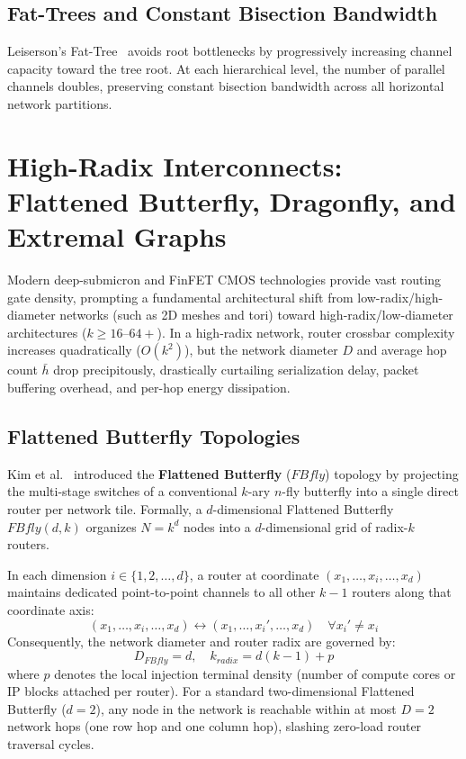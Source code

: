 \subsection{Fat-Trees and Constant Bisection Bandwidth}
Leiserson's Fat-Tree~\cite{Leiserson1985} avoids root bottlenecks by progressively increasing channel capacity toward the tree root. At each hierarchical level, the number of parallel channels doubles, preserving constant bisection bandwidth across all horizontal network partitions.

\section{High-Radix Interconnects: Flattened Butterfly, Dragonfly, and Extremal Graphs}
\label{sec:ch4_high_radix}

Modern deep-submicron and FinFET CMOS technologies provide vast routing gate density, prompting a fundamental architectural shift from low-radix/high-diameter networks (such as 2D meshes and tori) toward high-radix/low-diameter architectures ($k \ge 16$--$64+$). In a high-radix network, router crossbar complexity increases quadratically ($O(k^2)$), but the network diameter $D$ and average hop count $\bar{h}$ drop precipitously, drastically curtailing serialization delay, packet buffering overhead, and per-hop energy dissipation.

\subsection{Flattened Butterfly Topologies}
\label{subsec:ch4_fbfly}
Kim et al.~\cite{Kim2007} introduced the \textbf{Flattened Butterfly} ($FBfly$) topology by projecting the multi-stage switches of a conventional $k$-ary $n$-fly butterfly into a single direct router per network tile. Formally, a $d$-dimensional Flattened Butterfly $FBfly(d, k)$ organizes $N = k^d$ nodes into a $d$-dimensional grid of radix-$k$ routers.

In each dimension $i \in \{1, 2, \dots, d\}$, a router at coordinate $(x_1, \dots, x_i, \dots, x_d)$ maintains dedicated point-to-point channels to all other $k - 1$ routers along that coordinate axis:
\begin{equation}
(x_1, \dots, x_i, \dots, x_d) \longleftrightarrow (x_1, \dots, x_i', \dots, x_d) \quad \forall x_i' \neq x_i
\end{equation}
Consequently, the network diameter and router radix are governed by:
\begin{equation}
D_{FBfly} = d, \quad k_{radix} = d(k - 1) + p
\label{eq:ch4_fbfly_radix}
\end{equation}
where $p$ denotes the local injection terminal density (number of compute cores or IP blocks attached per router). For a standard two-dimensional Flattened Butterfly ($d = 2$), any node in the network is reachable within at most $D = 2$ network hops (one row hop and one column hop), slashing zero-load router traversal cycles.

